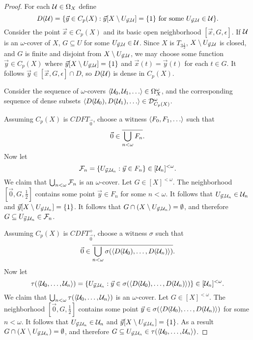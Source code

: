 \documentclass{amsart}
\theoremstyle{plain}
\theoremstyle{definition}
\theoremstyle{remark}
\theoremstyle{plain}
\theoremstyle{definition}
\theoremstyle{remark}
\begin{document}
\begin{proof}
  For each \(\mathcal{U}\in\Omega_{X}\) define
  \[
    D(\mathcal{U})
      =
    \{
      \vec y\in C_p(X)
    :
      \vec y[X\setminus U_{\vec y,\mathcal{U}}]=\{1\}
      \text{ for some }
      U_{\vec y,\mathcal{U}}\in\mathcal{U}
    \}
  .\]
  Consider the point \(\vec x\in C_p(X)\) and its basic open neighborhood
  \([\vec x,G,\epsilon]\). If \(\mathcal{U}\) is an \(\omega\)-cover
  of \(X\), \(G\subseteq U\) for some \(U_{\vec y,\mathcal{U}}\in\mathcal{U}\).
  Since \(X\) is
  \(T_{3\frac{1}{2}}\), \(X\setminus U_{\vec y,\mathcal{U}}\) is closed, and \(G\)
  is finite and disjoint from \(X\setminus U_{\vec y,\mathcal{U}}\),
  we may choose some function \(\vec y\in C_p(X)\) where
  \(\vec y[X\setminus U_{\vec y,\mathcal{U}}]=\{1\}\) and \(\vec x(t)=\vec y(t)\)
  for each \(t\in G\).
  It follows \(\vec y\in [\vec x,G,\epsilon]\cap D\), so \(D(\mathcal{U})\)
  is dense in \(C_p(X)\).

  Consider the sequence of \(\omega\)-covers
  \(\<\mc U_0,\mc U_1,\dots\>\in\Omega_X^\omega\), and the
  corresponding sequence of dense subsets
  \(\<D(\mc U_0),D(\mc U_1),\dots\>\in\mc D_{C_p(X)}^\omega\).

  Assuming \(C_p(X)\) is \(CDFT_{\vec 0}\), choose a witness
  \(\<F_0,F_1,\dots\>\) such that
  \[
    \vec 0 \in \overline{\bigcup_{n<\omega} F_n}
  .\]
  Now let
  \[
    \mathcal{F}_n
      =
    \{
      U_{\vec y,\mathcal{U}_n}
    :
      \vec y \in F_n
    \}
      \in
    [\mathcal{U}_n]^{<\omega}
  .\]
  We claim that \(\bigcup_{n<\omega}\mathcal{F}_n\) is an \(\omega\)-cover.
  Let \(G\in[X]^{<\omega}\). The neighborhood \([\vec 0,G,\frac{1}{2}]\)
  contains some point \(\vec y\in F_n\) for some \(n<\omega\). It follows
  that \(U_{\vec y,\mathcal{U}_n}\in\mathcal{U}_n\) and
  \(\vec y[X\setminus U_{\vec y,\mathcal{U}_n}]=\{1\}\). It follows that
  \(G\cap(X\setminus U_{\vec y,\mathcal{U}_n})=\emptyset\), and therefore
  \(G\subseteq U_{\vec y,\mathcal{U}_n}\in\mathcal{F}_n\).

  Assuming \(C_p(X)\) is \(CDFT_{\vec 0}^+\), choose a witness
  \(\sigma\) such that
  \[
    \vec 0
      \in
    \overline{\bigcup_{n<\omega} \sigma(\langle D(\mathcal{U}_0),\dots,D(\mathcal{U}_n)\rangle)}
  .\]
  Now let
  \[
    \tau(\langle\mathcal{U}_0,\dots,\mathcal{U}_n\rangle)
      =
    \{
      U_{\vec y,\mathcal{U}_n}
    :
      \vec y \in \sigma(\langle D(\mathcal{U}_0),\dots,D(\mathcal{U}_n)\rangle)
    \}
      \in
    [\mathcal{U}_n]^{<\omega}
  .\]
  We claim that \(\bigcup_{n<\omega}\tau(\langle\mathcal{U}_0,\dots,\mathcal{U}_n\rangle)\)
  is an \(\omega\)-cover.
  Let \(G\in[X]^{<\omega}\). The neighborhood \([\vec 0,G,\frac{1}{2}]\)
  contains some point \(\vec y\in \sigma(\langle D(\mathcal{U}_0),\dots,D(\mathcal{U}_n)\rangle)\)
  for some \(n<\omega\). It follows
  that \(U_{\vec y,\mathcal{U}_n}\in\mathcal{U}_n\) and
  \(\vec y[X\setminus U_{\vec y,\mathcal{U}_n}]=\{1\}\). As a result
  \(G\cap(X\setminus U_{\vec y,\mathcal{U}_n})=\emptyset\), and therefore
  \(G\subseteq U_{\vec y,\mathcal{U}_n}\in\mathcal{\tau}(\langle\mathcal{U}_0,\dots,\mathcal{U}_n\rangle)\).


\end{proof}
\end{document}
